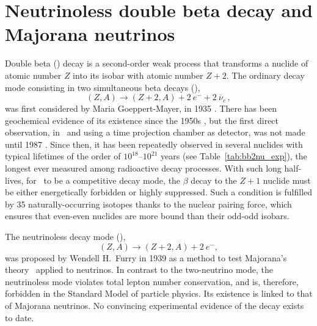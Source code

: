 \documentclass{PoS}
\begin{document}
\section{Neutrinoless double beta decay and Majorana neutrinos}

Double beta (\bb) decay is a second-order weak process that transforms a nuclide of atomic number $Z$ into its isobar with atomic number $Z+2$. The ordinary decay mode consisting in two simultaneous beta decays (\bbtnu),
\begin{equation}
(Z,A) \to (Z+2,A) + 2~e^{-} + 2~\overline{\nu}_{e}\, ,
\end{equation}
was first considered by Maria Goeppert-Mayer, in 1935 \cite{GoeppertMayer:1935qp}. There has been geochemical evidence of its existence since the 1950s \cite{Inghram:1950qv}, but the first direct observation, in \SE\ and using a time projection chamber as detector, was not made until 1987 \cite{Elliott:1987kp}. Since then, it has been repeatedly observed in several nuclides with typical lifetimes of the order of $10^{18}$--$10^{21}$ years (see Table~\ref{tab:bb2nu_exp}), the longest ever measured among radioactive decay processes. With such long half-lives, for \bbtnu\ to be a competitive decay mode, the $\beta$ decay to the $Z+1$ nuclide must be either energetically forbidden or highly suppressed. Such a condition is fulfilled by 35 naturally-occurring isotopes thanks to the nuclear pairing force, which ensures that even-even nuclides are more bound than their odd-odd isobars.

The neutrinoless decay mode (\bbonu),
\begin{equation}
(Z,A) \rightarrow (Z+2,A) + 2\ e^{-}, \label{eq:bb0nu}
\end{equation}
was proposed by Wendell H.\ Furry in 1939 \cite{Furry:1939qr} as a method to test Majorana's theory~\cite{Majorana:1937vz} applied to neutrinos. In contrast to the two-neutrino mode, the neutrinoless mode violates total lepton number conservation, and is, therefore, forbidden in the Standard Model of particle physics. Its existence is linked to that of Majorana neutrinos. No convincing experimental evidence of the decay exists to date. 
\end{document}
